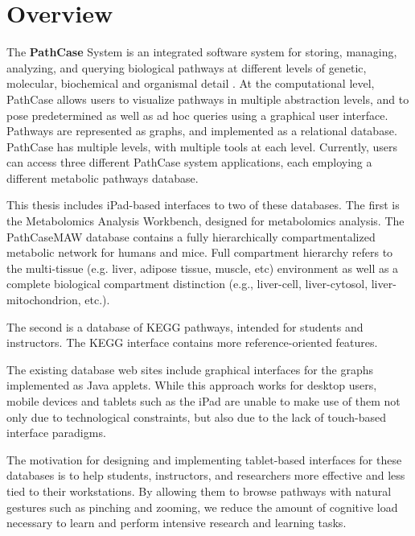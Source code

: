 \section{Overview}
\label{sect:overview}

The \textbf{PathCase} System is an integrated software system for storing,
managing, analyzing, and querying biological pathways at different levels of
genetic, molecular, biochemical and organismal detail \cite{pathcase-basic}. At
the computational level, PathCase allows users to visualize pathways in multiple
abstraction levels, and to pose predetermined as well as ad hoc queries using a
graphical user interface. Pathways are represented as graphs, and implemented as
a relational database. PathCase has multiple levels, with multiple tools at each
level. Currently, users can access three different PathCase system applications,
each employing a different metabolic pathways database.

This thesis includes iPad-based interfaces to two of these databases. The first
is the Metabolomics Analysis Workbench, designed for metabolomics analysis. The
PathCaseMAW database contains a fully hierarchically compartmentalized metabolic
network for humans and mice. Full compartment hierarchy refers to the
multi-tissue (e.g. liver, adipose tissue, muscle, etc) environment as well as a
complete biological compartment distinction (e.g., liver-cell, liver-cytosol,
liver-mitochondrion, etc.).

The second is a database of KEGG pathways, intended for students and
instructors. The KEGG interface contains more reference-oriented features.

The existing database web sites include graphical interfaces for the graphs
implemented as Java applets. While this approach works for desktop users, mobile
devices and tablets such as the iPad are unable to make use of them not only due
to technological constraints, but also due to the lack of touch-based interface
paradigms.

The motivation for designing and implementing tablet-based interfaces for these
databases is to help students, instructors, and researchers more effective and
less tied to their workstations. By allowing them to browse pathways with
natural gestures such as pinching and zooming, we reduce the amount of cognitive
load necessary to learn and perform intensive research and learning tasks.
